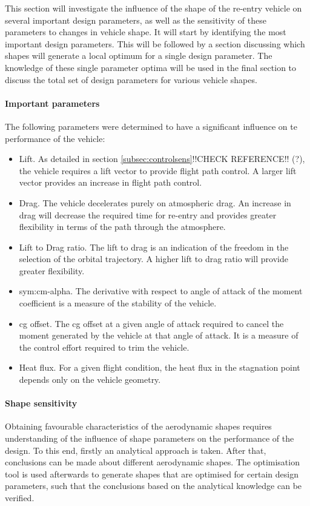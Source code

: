 This section will investigate the influence of the shape of the re-entry vehicle on several important design parameters, as well as the sensitivity of these parameters to changes in vehicle shape. It will start by identifying the most important design parameters. This will be followed by a section discussing which shapes will generate a local optimum for a single design parameter. The knowledge of these single parameter optima will be used in the final section to discuss the total set of design parameters for various vehicle shapes. 


\paragraph{Important parameters}
 The following parameters were determined to have a significant influence on te performance of the vehicle:

\begin{itemize}
	\item{Lift. As detailed in section \ref{subsec:controlsens}!!CHECK REFERENCE!! (?), the vehicle requires a lift vector to provide flight path control. A larger lift vector provides an increase in flight path control.}
	\item{Drag. The vehicle decelerates purely on atmospheric drag. An increase in drag will decrease the required time for re-entry and provides greater flexibility in terms of the path through the atmosphere. }
	\item{Lift to Drag ratio. The lift to drag is an indication of the freedom in the selection of the orbital trajectory. A higher lift to drag ratio will provide greater flexibility.}
	\item{\gls{sym:cm-alpha}. The derivative with respect to angle of attack of the moment coefficient is a measure of the stability of the vehicle. }
	\item{\gls{cg} offset}. The \gls{cg} offset at a given angle of attack required to cancel the moment generated by the vehicle at that angle of attack. It is a measure of the control effort required to trim the vehicle. 
	\item{Heat flux. For a given flight condition, the heat flux in the stagnation point depends only on the vehicle geometry.  }
\end{itemize}


\paragraph{Shape sensitivity} \label{sec:aerooptima}
Obtaining favourable characteristics of the aerodynamic shapes requires understanding of the influence of shape parameters on the performance of the design. To this end, firstly an analytical approach is taken. After that, conclusions can be made about different aerodynamic shapes. The optimisation tool is used afterwards to generate shapes that are optimised for certain design parameters, such that the conclusions based on the analytical knowledge can be verified.

